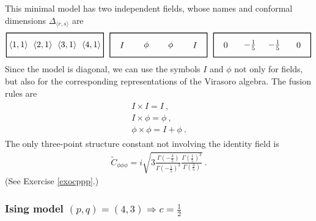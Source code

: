 \documentclass[12pt, a4paper, notitlepage, twoside]{report}
\numberwithin{equation}{section}
\theoremstyle{break}
\begin{document}
This minimal model has two independent fields, whose names and conformal dimensions $\Delta_{\langle r,s\rangle}$ are 
\begin{align}
 \begin{tikzpicture}[scale = .5, baseline=(current  bounding  box.center)]
  \draw[thick] (-1,-1) -- (-1, 1) -- (7, 1) -- (7, -1) -- cycle;
  \foreach \x in {1, ..., 4}{
  \node at ({2*(\x-1)}, 0) {$\langle \x,1\rangle $};
  }
 \end{tikzpicture}
 \ \ 
 \begin{tikzpicture}[scale = .5, baseline=(current  bounding  box.center)]
  \draw[thick] (-1,-1) -- (-1, 1) -- (7, 1) -- (7, -1) -- cycle;
  \node at (0, 0) {$I$};
  \node at (2, 0) {$\phi$};
  \node at (4, 0) {$\phi$};
  \node at (6, 0) {$I$};
  \end{tikzpicture}
  \ \ 
  \begin{tikzpicture}[scale = .5, baseline=(current  bounding  box.center)]
  \draw[thick] (-1,-1) -- (-1, 1) -- (7, 1) -- (7, -1) -- cycle;
  \node at (0, 0) {$0$};
  \node at (2, 0) {$-\frac15$};
  \node at (4, 0) {$-\frac15$};
  \node at (6, 0) {$0$};
  \end{tikzpicture}
\end{align}
Since the model is diagonal, we can use the symbols $I$ and $\phi$ not only for fields, but also for the corresponding representations of the Virasoro algebra.
The fusion rules are 
\begin{align}
 \begin{array}{l}
  I\times I = I \ ,
\\ I\times \phi= \phi\ ,
\\ \phi \times \phi = I + \phi\ .
 \end{array}
\end{align}
The only three-point structure constant not involving the identity field is 
\begin{align}
 \tilde{C}_{\phi\phi\phi} = i\sqrt{3\frac{\Gamma(-\frac35)}{\Gamma(-\frac15)^3} \frac{\Gamma(\frac15)^3}{\Gamma(\frac35)}}\ .
\label{cppp}
\end{align}
(See Exercise \ref{exocppp}.)

\subsubsection{\textbf{\boldmath Ising model} $(p,q)=(4,3) \Rightarrow c=\tfrac12$}
\end{document}
